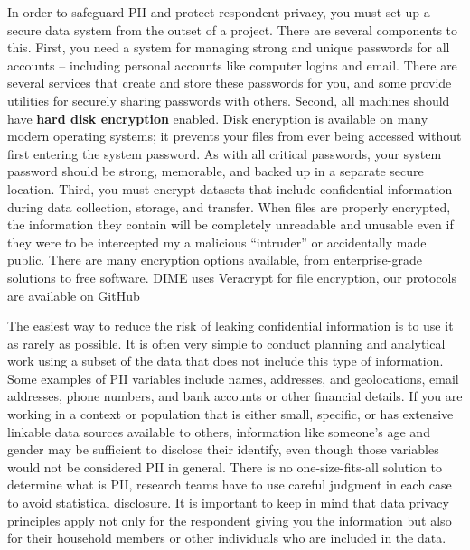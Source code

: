 In order to safeguard PII and protect respondent privacy,
you must set up a secure data system from the outset of a project.
There are several components to this.
First, you need a system for managing strong and unique passwords for
all accounts -- including personal accounts like computer logins and email.
There are several services that create and store these passwords for you,
and some provide utilities for securely sharing passwords with others.
Second, all machines should have \textbf{hard disk encryption} enabled.
Disk encryption is available on many modern operating systems;
it prevents your files from ever being accessed
without first entering the system password.
As with all critical passwords, your system password should be strong,
memorable, and backed up in a separate secure location.
Third, you must encrypt datasets that include confidential information
during data collection, storage, and transfer.
When files are properly encrypted,
the information they contain will be completely unreadable and unusable
even if they were to be intercepted my a malicious
``intruder'' or accidentally made public.
There are many encryption options available, from enterprise-grade solutions to free software.
DIME uses Veracrypt for file encryption,
our protocols are available on GitHub

The easiest way to reduce the risk of leaking confidential information
is to use it as rarely as possible.
It is often very simple to conduct planning and analytical work
using a subset of the data that does not include this type of information.
Some examples of PII variables include names, addresses, and geolocations,
email addresses, phone numbers,
and bank accounts or other financial details.
If you are working in a context or population that is either small, specific,
or has extensive linkable data sources available to others,
information like someone's age and gender may be sufficient to
disclose their identify, even though those variables would not be considered PII in general.
There is no one-size-fits-all solution to determine what is PII,
research teams have to use careful judgment in each case to avoid statistical disclosure.
It is important to keep in mind that data privacy principles apply
not only for the respondent giving you the information
but also for their household members or other individuals who are included in the data.

